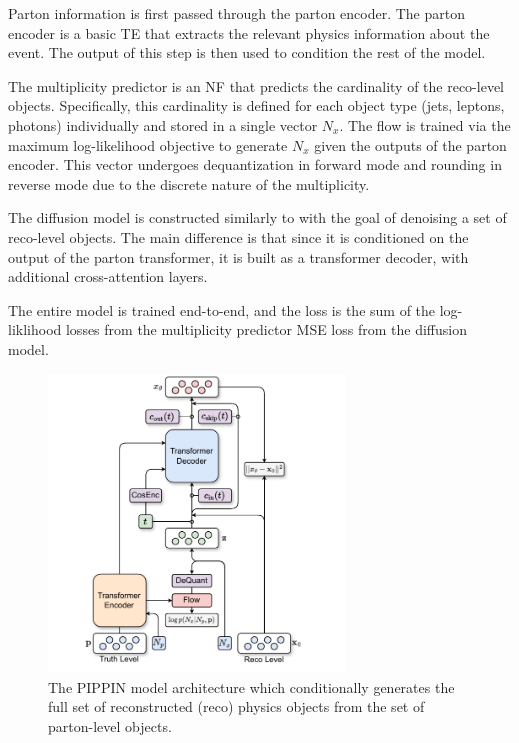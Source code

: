 Parton information is first passed through the parton encoder.
The parton encoder is a basic TE that extracts the relevant physics information about the event.
The output of this step is then used to condition the rest of the model.

The multiplicity predictor is an NF that predicts the cardinality of the reco-level objects.
Specifically, this cardinality is defined for each object type (jets, leptons, photons) individually and stored in a single vector $N_x$.
The flow is trained via the maximum log-likelihood objective to generate $N_x$ given the outputs of the parton encoder.
This vector undergoes dequantization in forward mode and rounding in reverse mode due to the discrete nature of the multiplicity.

The diffusion model is constructed similarly to \pcdroid with the goal of denoising a set of reco-level objects.
The main difference is that since it is conditioned on the output of the parton transformer, it is built as a transformer decoder, with additional cross-attention layers.

The entire model is trained end-to-end, and the loss is the sum of the log-liklihood losses from the multiplicity predictor MSE loss from the diffusion model.

\begin{figure}[tb]
    \centering
    \includegraphics[width=0.70\textwidth]{Figures/jet_generation/PIPPIN.pdf}
    \caption{
        The PIPPIN model architecture which conditionally generates the full set of reconstructed (reco) physics objects from the set of parton-level objects.
    }
    \label{fig:pippin}
\end{figure}

